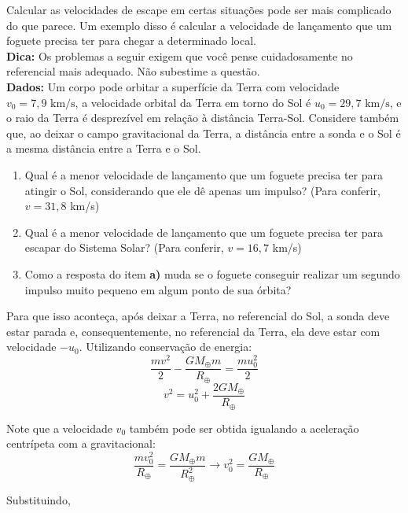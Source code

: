 \documentclass[11pt]{article}
\begin{document}
\begin{pproblem} Calcular as velocidades de escape em certas situações pode ser mais complicado do que parece. Um exemplo disso é calcular a velocidade de lançamento que um foguete precisa ter para chegar a determinado local.
    \\
    \textbf{Dica:} Os problemas a seguir exigem que você pense cuidadosamente no referencial mais adequado. Não subestime a questão.
    \\
    \textbf{Dados:} Um corpo pode orbitar a superfície da Terra com velocidade \(v_0 = 7,9\text{ km/s}\), a velocidade orbital da Terra em torno do Sol é \(u_0 = 29,7\text{ km/s}\), e o raio da Terra é desprezível em relação à distância Terra-Sol. Considere também que, ao deixar o campo gravitacional da Terra, a distância entre a sonda e o Sol é a mesma distância entre a Terra e o Sol.
    \begin{enumerate}[label=\textbf{\alph*)}]
        \item Qual é a menor velocidade de lançamento que um foguete precisa ter para atingir o Sol, considerando que ele dê apenas um impulso? (Para conferir, \(v = 31,8\) km/s)
        \item Qual é a menor velocidade de lançamento que um foguete precisa ter para escapar do Sistema Solar? (Para conferir, \(v = 16,7\) km/s)
        \item Como a resposta do item \textbf{a)} muda se o foguete conseguir realizar um segundo impulso muito pequeno em algum ponto de sua órbita?
    \end{enumerate}

    \begin{pssolution*}{}{}
        \begin{alternativas}
            \item Para que isso aconteça, após deixar a Terra, no referencial do Sol, a sonda deve estar parada e, consequentemente, no referencial da Terra, ela deve estar com velocidade \(-u_0\). Utilizando conservação de energia:
            \[\frac{mv^2}{2}-\frac{GM_\oplus m}{R_\oplus} = \frac{mu_0^2}{2}\]
            \[v^2 = u_0^2+\frac{2GM_\oplus}{R_\oplus}\]

            Note que a velocidade \(v_0\) também pode ser obtida igualando a aceleração centrípeta com a gravitacional:
            \[\frac{mv_0^2}{R_\oplus} = \frac{GM_\oplus m}{R_\oplus^2} \rightarrow v_0^2 = \frac{GM_\oplus}{R_\oplus}\]

            Substituindo,


\end{alternativas}
\end{pssolution*}
\end{pproblem}
\end{document}
